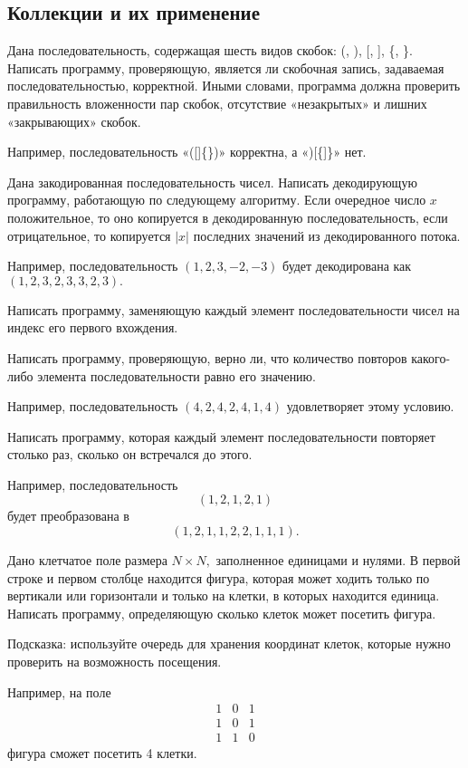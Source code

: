 \subsection{Коллекции и их применение}

\task Дана последовательность, содержащая шесть видов скобок: (, ), [,
], \{, \}. Написать программу, проверяющую, является ли скобочная
запись, задаваемая последовательностью, корректной. Иными словами,
программа должна проверить правильность вложенности пар скобок,
отсутствие «незакрытых» и лишних «закрывающих» скобок.

Например, последовательность «([]\{\})» корректна, а «)[\{]\}» нет.

\task Дана закодированная последовательность чисел. Написать
декодирующую программу, работающую по следующему алгоритму. Если
очередное число $x$ положительное, то оно копируется в декодированную
последовательность, если отрицательное, то копируется $|x|$ последних
значений из декодированного потока.

Например, последовательность $(1, 2, 3, -2, -3)$ будет декодирована как
$(1, 2, 3, 2, 3, 3, 2, 3).$

\task Написать программу, заменяющую каждый элемент последовательности
чисел на индекс его первого вхождения.

\task Написать программу, проверяющую, верно ли, что количество
повторов какого-либо элемента последовательности равно его значению.

Например, последовательность $(4, 2, 4, 2, 4, 1, 4)$ удовлетворяет
этому условию.

\task Написать программу, которая каждый элемент последовательности
повторяет столько раз, сколько он встречался до этого.

Например, последовательность
\[
(1, 2, 1, 2, 1)
\]
будет преобразована в 
\[
(1, 2, 1, 1, 2, 2, 1, 1, 1).
\]

\task Дано клетчатое поле размера $N\times N,$ заполненное единицами и
нулями. В первой строке и первом столбце находится фигура, которая
может ходить только по вертикали или горизонтали и только на клетки, в
которых находится единица. Написать программу, определяющую сколько
клеток может посетить фигура.

Подсказка: используйте очередь для хранения координат клеток, которые
нужно проверить на возможность посещения.

Например, на поле
\[
\begin{array}{ccc}
  1 & 0 & 1 \\
  1 & 0 & 1 \\
  1 & 1 & 0
\end{array}
\]
фигура сможет посетить 4 клетки.

